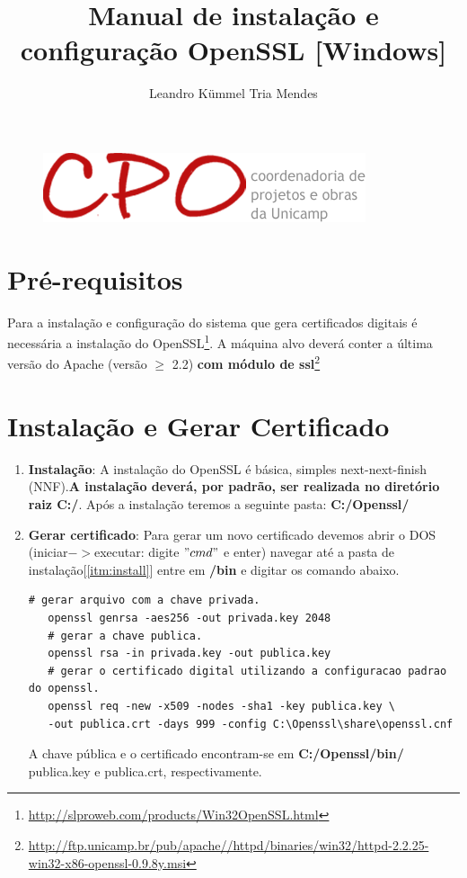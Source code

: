 \documentclass[a4paper,10pt]{article}
\title{Manual de instalação e configuração OpenSSL [Windows]}
\author{Leandro Kümmel Tria Mendes}
\begin{document}
\maketitle
\begin{figure}[!htb]
  \centering
  \includegraphics[scale=0.5]{../img/logo.png}
\end{figure}
\newpage
\tableofcontents
\listoffigures
\listoftables
\section{Pré-requisitos}
Para a instalação e configuração do sistema que gera certificados digitais é necessária a instalação do OpenSSL\footnote{\url{http://slproweb.com/products/Win32OpenSSL.html}}. A máquina alvo deverá conter a última versão do Apache (versão $\ge$ 2.2) \textbf{com módulo de ssl}\footnote{\url{http://ftp.unicamp.br/pub/apache//httpd/binaries/win32/httpd-2.2.25-win32-x86-openssl-0.9.8y.msi}} 
\section{Instalação e Gerar Certificado}
\begin{enumerate}[I]
\item \label{itm:install} \textbf{Instalação}: A instalação do OpenSSL é básica, simples next-next-finish (NNF).\textbf{A instalação deverá, por padrão, ser realizada no diretório raiz C:/}. Após a instalação teremos a seguinte pasta: \textbf{C:/Openssl/}
\item \label{itm:createcert} \textbf{Gerar certificado}: Para gerar um novo certificado devemos abrir o DOS (iniciar$->$executar: digite $"cmd"$ e enter) navegar até a pasta de instalação[\ref{itm:install}] entre em \textbf{/bin} e digitar os comando abaixo.
 \begin{lstlisting}[caption={Gerar chave e certificado}]
   # gerar arquivo com a chave privada.
   openssl genrsa -aes256 -out privada.key 2048 
   # gerar a chave publica.
   openssl rsa -in privada.key -out publica.key 
   # gerar o certificado digital utilizando a configuracao padrao do openssl.
   openssl req -new -x509 -nodes -sha1 -key publica.key \
   -out publica.crt -days 999 -config C:\Openssl\share\openssl.cnf
 \end{lstlisting}
 A chave pública e o certificado encontram-se em \textbf{C:/Openssl/bin/}  publica.key e publica.crt, respectivamente.
\end{enumerate}
\end{document}
